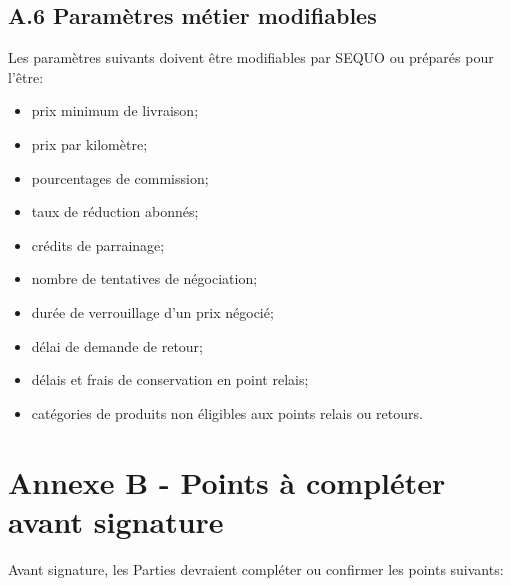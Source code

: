 \documentclass[11pt,a4paper]{article}
\begin{document}
\subsection*{A.6 Paramètres métier modifiables}

Les paramètres suivants doivent être modifiables par SEQUO ou préparés pour l'être:

\begin{itemize}
    \item prix minimum de livraison;
    \item prix par kilomètre;
    \item pourcentages de commission;
    \item taux de réduction abonnés;
    \item crédits de parrainage;
    \item nombre de tentatives de négociation;
    \item durée de verrouillage d'un prix négocié;
    \item délai de demande de retour;
    \item délais et frais de conservation en point relais;
    \item catégories de produits non éligibles aux points relais ou retours.
\end{itemize}

\section*{Annexe B - Points à compléter avant signature}

Avant signature, les Parties devraient compléter ou confirmer les points suivants:
\end{document}
